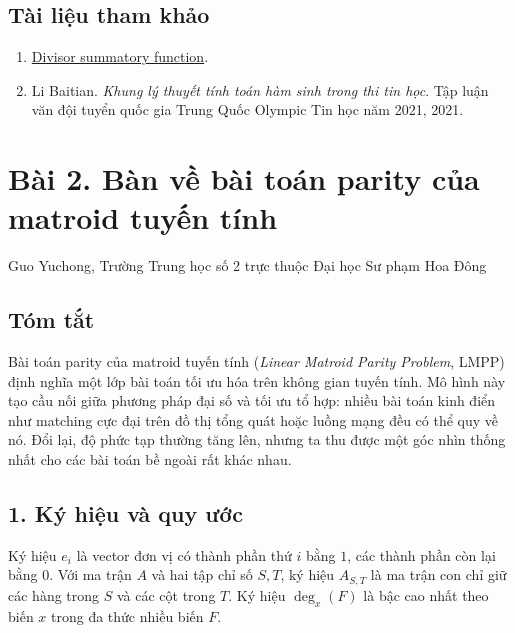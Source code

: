 \documentclass[11pt]{article}
\begin{document}
\subsection*{Tài liệu tham khảo}

\begin{enumerate}
  \item \href{https://en.wikipedia.org/wiki/Divisor_summatory_function}{Divisor
  summatory function}.
  \item Li Baitian. \emph{Khung lý thuyết tính toán hàm sinh trong thi tin
  học}. Tập luận văn đội tuyển quốc gia Trung Quốc Olympic Tin học năm 2021,
  2021.
\end{enumerate}

\section*{Bài 2. Bàn về bài toán parity của matroid tuyến tính}

\begin{center}
Guo Yuchong, Trường Trung học số 2 trực thuộc Đại học Sư phạm Hoa Đông
\end{center}

\subsection*{Tóm tắt}

Bài toán parity của matroid tuyến tính (\emph{Linear Matroid Parity Problem},
LMPP) định nghĩa một lớp bài toán tối ưu hóa trên không gian tuyến tính. Mô
hình này tạo cầu nối giữa phương pháp đại số và tối ưu tổ hợp: nhiều bài toán
kinh điển như matching cực đại trên đồ thị tổng quát hoặc luồng mạng đều có thể
quy về nó. Đổi lại, độ phức tạp thường tăng lên, nhưng ta thu được một góc nhìn
thống nhất cho các bài toán bề ngoài rất khác nhau.

\subsection*{1. Ký hiệu và quy ước}

Ký hiệu \(e_i\) là vector đơn vị có thành phần thứ \(i\) bằng \(1\), các thành
phần còn lại bằng \(0\). Với ma trận \(A\) và hai tập chỉ số \(S,T\), ký hiệu
\(A_{S,T}\) là ma trận con chỉ giữ các hàng trong \(S\) và các cột trong \(T\).
Ký hiệu \(\deg_x(F)\) là bậc cao nhất theo biến \(x\) trong đa thức nhiều biến
\(F\).
\end{document}
